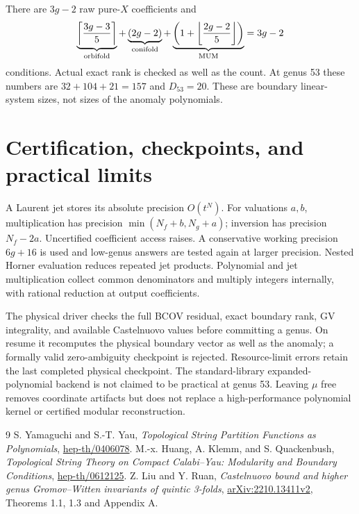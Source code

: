 \documentclass[11pt]{article}
\begin{document}
There are $3g-2$ raw pure-$X$ coefficients and
\[
 \underbrace{\left\lceil\frac{3g-3}5\right\rceil}_{\rm orbifold}
 +\underbrace{(2g-2)}_{\rm conifold}
 +\underbrace{\left(1+\left\lfloor\frac{2g-2}5\right\rfloor\right)}_{\rm MUM}
 =3g-2
\]
conditions. Actual exact rank is checked as well as the count.
At genus 53 these numbers are $32+104+21=157$ and $D_{53}=20$.
These are boundary linear-system sizes, not sizes of the anomaly polynomials.

\section{Certification, checkpoints, and practical limits}
A Laurent jet stores its absolute precision $O(t^N)$.
For valuations $a,b$, multiplication has precision
$\min(N_f+b,N_g+a)$; inversion has precision $N_f-2a$.
Uncertified coefficient access raises. A conservative working precision
$6g+16$ is used and low-genus answers are tested again at larger precision.
Nested Horner evaluation reduces repeated jet products.
Polynomial and jet multiplication collect common denominators and multiply
integers internally, with rational reduction at output coefficients.

The physical driver checks the full BCOV residual, exact boundary rank,
GV integrality, and available Castelnuovo values before committing a genus.
On resume it recomputes the physical boundary vector as well as the anomaly;
a formally valid zero-ambiguity checkpoint is rejected.
Resource-limit errors retain the last completed physical checkpoint.
The standard-library expanded-polynomial backend is not claimed to be practical
at genus 53. Leaving $\mu$ free removes coordinate artifacts but does not
replace a high-performance polynomial kernel or certified modular reconstruction.

\begin{thebibliography}{9}
 S. Yamaguchi and S.-T. Yau,
\emph{Topological String Partition Functions as Polynomials},
\href{https://arxiv.org/abs/hep-th/0406078}{hep-th/0406078}.
 M.-x. Huang, A. Klemm, and S. Quackenbush,
\emph{Topological String Theory on Compact Calabi--Yau: Modularity and Boundary Conditions},
\href{https://arxiv.org/abs/hep-th/0612125}{hep-th/0612125}.
 Z. Liu and Y. Ruan,
\emph{Castelnuovo bound and higher genus Gromov--Witten invariants of quintic 3-folds},
\href{https://arxiv.org/abs/2210.13411}{arXiv:2210.13411v2},
Theorems 1.1, 1.3 and Appendix A.
\end{thebibliography}
\end{document}
